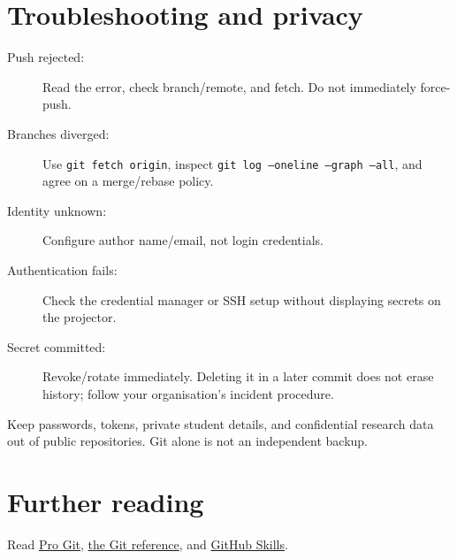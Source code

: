 \documentclass[11pt]{article}
\begin{document}
\section{Troubleshooting and privacy}
\begin{description}
\item[Push rejected:] Read the error, check branch/remote, and fetch.
Do not immediately force-push.
\item[Branches diverged:] Use \texttt{git fetch origin}, inspect
\texttt{git log --oneline --graph --all}, and agree on a merge/rebase policy.
\item[Identity unknown:] Configure author name/email, not login credentials.
\item[Authentication fails:] Check the credential manager or SSH setup without
displaying secrets on the projector.
\item[Secret committed:] Revoke/rotate immediately. Deleting it in a later
commit does not erase history; follow your organisation's incident procedure.
\end{description}
Keep passwords, tokens, private student details, and confidential research
data out of public repositories. Git alone is not an independent backup.

\section{Further reading}
Read \href{https://git-scm.com/book/en/v2}{Pro Git},
\href{https://git-scm.com/docs}{the Git reference}, and
\href{https://skills.github.com/}{GitHub Skills}.
\end{document}
